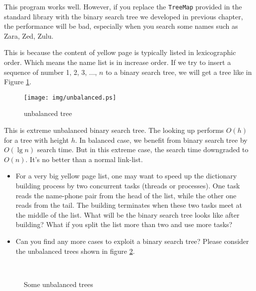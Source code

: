 \documentclass{article}
\begin{document}
This program works well. However, if you replace the \texttt{TreeMap} provided in
the standard library with the binary search tree we developed in previous chapter, the
performance will be bad, especially when you search some names such
as Zara, Zed, Zulu.

This is because the content of yellow page is typically listed
in lexicographic order. Which means the name list is in increase
order. If we try to insert a sequence of number 1, 2, 3, ..., $n$
to a binary search tree, we will get a tree like in Figure \ref{fig:unbalanced-tree}.

\begin{figure}[htbp]
       \centering
	\texttt{[image: img/unbalanced.ps]}
        \caption{unbalanced tree} \label{fig:unbalanced-tree}
\end{figure}

This is extreme unbalanced binary search tree. The looking up performs
$O(h)$ for a tree with height $h$. In balanced case, we benefit from
binary search tree by $O(\lg n)$ search time. But in this extreme case,
the search time downgraded to $O(n)$. It's no better than a normal link-list.

\begin{Exercise}

\begin{itemize}
\item For a very big yellow page list, one may want to speed up the
dictionary building process by two concurrent tasks (threads or processes).
One task reads the name-phone pair from the head of the list, while the
other one reads from the tail. The building terminates when these
two tasks meet at the middle of the list. What will be the binary
search tree looks like after building? What if you split the
list more than two and use more tasks?

\item Can you find any more cases to exploit a binary search tree?
Please consider the unbalanced trees shown in figure
\ref{fig:unbalanced-trees}.
\end{itemize}

\end{Exercise}

\begin{figure}[htbp]
       \centering
        \\
       \caption{Some unbalanced trees}
       \label{fig:unbalanced-trees}
\end{figure}
\end{document}
